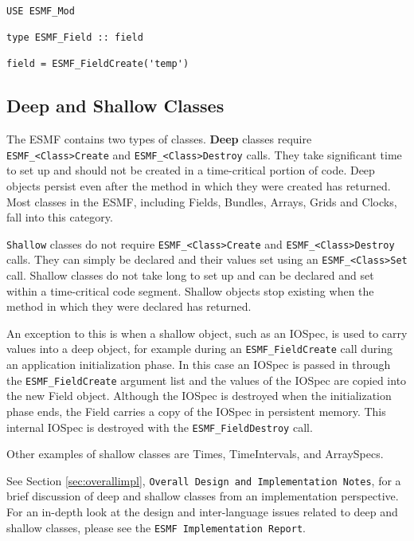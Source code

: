 \begin{verbatim}

USE ESMF_Mod

type ESMF_Field :: field

field = ESMF_FieldCreate('temp')

\end{verbatim}

\subsection{Deep and Shallow Classes}
\label{sec:deepshallow}

The ESMF contains two types of classes.  {\bf Deep} classes require
{\tt ESMF\_<Class>Create} and {\tt ESMF\_<Class>Destroy} calls.
They take significant time to set up and should not be created
in a time-critical portion of code.  Deep objects persist 
even after the method in which they were created has returned.
Most classes in the ESMF, including Fields, Bundles, Arrays,
Grids and Clocks, fall into this category.

{\tt Shallow} classes do not require {\tt ESMF\_<Class>Create}
 and {\tt ESMF\_<Class>Destroy} calls.  They can simply be declared
and their values set using an {\tt ESMF\_<Class>Set} call.  Shallow
classes do not take long to set up and can be declared and set within
a time-critical code segment.  Shallow objects stop existing when
the method in which they were declared has returned.  

An exception to this is when a shallow object, such as an IOSpec, 
is used to carry values into a deep object, for example during an 
{\tt ESMF\_FieldCreate} call during an application initialization 
phase.  In this case an IOSpec is passed
in through the {\tt ESMF\_FieldCreate} argument list and the values 
of the IOSpec are copied into the new Field object.  Although the 
IOSpec is destroyed when the initialization phase ends, 
the Field carries a copy of the IOSpec in persistent memory.  This 
internal IOSpec is destroyed with the {\tt ESMF\_FieldDestroy} call.

Other examples of shallow classes are Times, TimeIntervals, and 
ArraySpecs.

See Section \ref{sec:overallimpl}, {\tt Overall Design and Implementation 
Notes}, for a brief discussion of deep and shallow classes from 
an implementation perspective.  For an in-depth look at the design 
and inter-language issues related to deep and shallow classes, please 
see the {\tt ESMF Implementation Report}.

